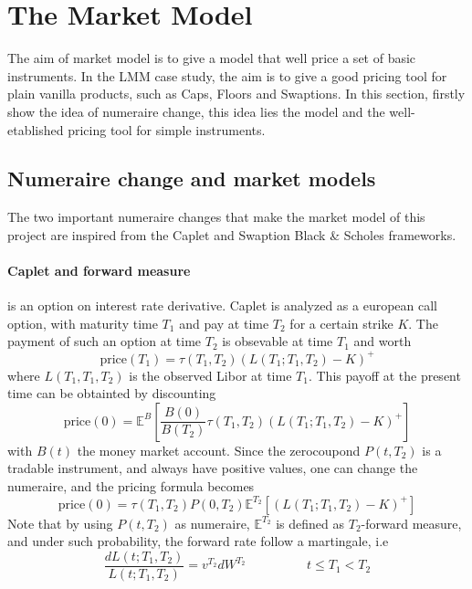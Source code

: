 \documentclass[a4paper,10pt]{article}
\begin{document}
\newpage
\section{The Market Model}
The aim of market model is to give a model that well price a set of basic instruments. In the LMM case study, the aim is to give a good pricing tool for plain vanilla products, such as Caps, Floors and Swaptions. In this section, firstly show the idea of numeraire change, this idea lies the model and the well-etablished pricing tool for simple instruments. 
\subsection{Numeraire change and market models}
The two important numeraire changes that make the market model of this project are inspired from the Caplet and Swaption Black \& Scholes frameworks. 
\paragraph{ Caplet and forward measure } is an option on interest rate derivative. Caplet is analyzed as a european call option, with maturity time $T_1$ and pay at time $T_2$ for a certain strike $K$. The payment of such an option at time $T_2$ is obsevable at time $T_1$ and worth
\[
\text{price}(T_1) = \tau(T_1,T_2)( L(T_1;T_1,T_2) - K )^+ 
\] 
where $L(T_1,T_1,T_2)$ is the observed Libor at time $T_1$. This payoff at the present time can be obtainted by discounting 
\[
\text{price}(0) = \mathbb{E}^{B}\left[ \frac{B(0)}{B(T_2)} \tau(T_1,T_2)( L(T_1;T_1,T_2) - K )^+  \right]
\]
with $B(t)$ the money market account. Since the zerocoupond $P(t,T_2)$ is a tradable instrument, and always have positive values, one can change the numeraire, and the pricing formula becomes
\[
\text{price}(0) = \tau(T_1,T_2)P(0,T_2) \mathbb{E}^{T_2}\left[ ( L(T_1;T_1,T_2) - K )^+  \right]
\]
Note that by using $P(t,T_2)$ as numeraire, $\mathbb{E}^{T_2}$ is defined as $T_2$-forward measure, and under such probability, the forward rate follow a martingale, i.e
\[
\frac{dL(t;T_1,T_2)}{L(t;T_1,T_2)} = v^{T_2}dW^{T_2}
\hspace{2cm}
t\leq T_1 < T_2
\]
\end{document}
